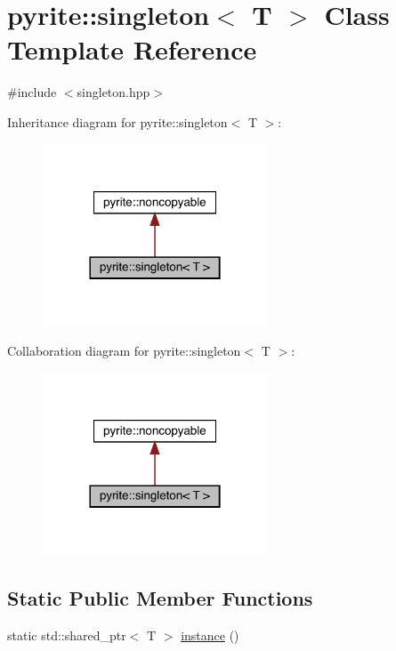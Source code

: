 \hypertarget{classpyrite_1_1singleton}{}\section{pyrite\+:\+:singleton$<$ T $>$ Class Template Reference}
\label{classpyrite_1_1singleton}


{\ttfamily \#include $<$singleton.\+hpp$>$}



Inheritance diagram for pyrite\+:\+:singleton$<$ T $>$\+:
\nopagebreak
\begin{figure}[H]
\begin{center}
\leavevmode
\includegraphics[width=189pt]{dc/d66/classpyrite_1_1singleton__inherit__graph}
\end{center}
\end{figure}


Collaboration diagram for pyrite\+:\+:singleton$<$ T $>$\+:
\nopagebreak
\begin{figure}[H]
\begin{center}
\leavevmode
\includegraphics[width=189pt]{d3/dd3/classpyrite_1_1singleton__coll__graph}
\end{center}
\end{figure}
\subsection*{Static Public Member Functions}
\begin{DoxyCompactItemize}
\item 
static std\+::shared\+\_\+ptr$<$ T $>$ \mbox{\hyperlink{classpyrite_1_1singleton_a60ded278bfa70dcd8d0099ce3016ca40}{instance}} ()
\end{DoxyCompactItemize}
